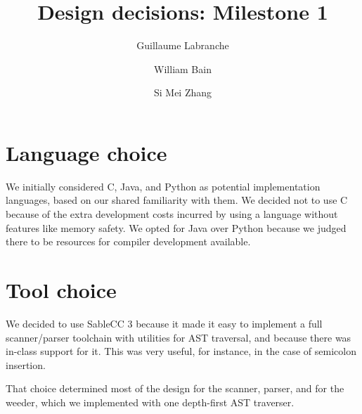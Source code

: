 \documentclass[oneside]{article}
\begin{document}
\title{Design decisions: Milestone 1}
\author{Guillaume Labranche \and William Bain \and Si Mei Zhang}
\maketitle

\section{Language choice}

We initially considered C, Java, and Python as potential implementation languages, based on our shared familiarity with them. We decided not to use C because of the extra development costs incurred by using a language without features like memory safety. We opted for Java over Python because we judged there to be resources for compiler development available.

\section{Tool choice}

We decided to use SableCC 3 because it made it easy to implement a full scanner/parser toolchain with utilities for AST traversal, and because there was in-class support for it. This was very useful, for instance, in the case of semicolon insertion.

That choice determined most of the design for the scanner, parser, and for the weeder, which we implemented with one depth-first AST traverser.
\end{document}
